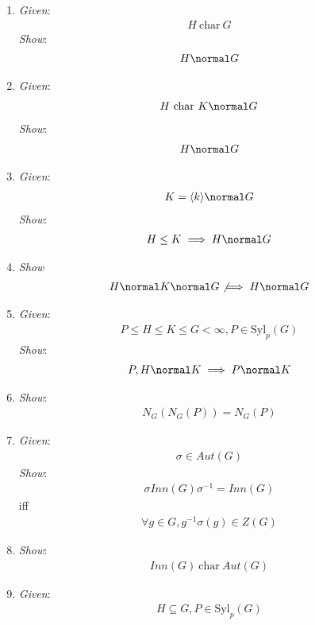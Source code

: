 \begin{enumerate}
\def\labelenumi{\arabic{enumi}.}
\item
  \emph{Given}: \begin{align*}
  H~\text{char}~G\end{align*}
   \emph{Show}: \begin{align*}
  H \normal G\end{align*}
\item
  \emph{Given}: \begin{align*}
  H ~\text{char}~ K \normal G\end{align*}
   \emph{Show}: \begin{align*}
  H \normal G\end{align*}
\item
  \emph{Given}: \begin{align*}
  K = \langle k \rangle \normal G\end{align*}
   \emph{Show}: \begin{align*}
  H \leq K \implies H \normal G\end{align*}
\item
  \emph{Show} \begin{align*}
  H \normal K \normal G \not\implies H \normal G\end{align*}
\item
  \emph{Given}: \begin{align*}
  P \leq H \leq K \leq G < \infty, P \in \text{Syl}_p(G)\end{align*}
   \emph{Show}: \begin{align*}
  P, H \normal K \implies P \normal K\end{align*}
\item
  \emph{Show}: \begin{align*}
  N_G(N_G(P)) = N_G(P)\end{align*}
\item
  \emph{Given}: \begin{align*}
  \sigma \in Aut(G)\end{align*}
   \emph{Show}: \begin{align*}
  \sigma Inn(G) \sigma^{-1} = Inn(G)\end{align*}
   iff \begin{align*}
  \forall g\in G, g^{-1}\sigma(g)\in Z(G)\end{align*}
\item
  \emph{Show}: \begin{align*}
  Inn(G) ~\text{char}~ Aut(G)\end{align*}
\item
  \emph{Given}: \begin{align*}
  H \subseteq G, P \in \text{Syl}_p(G)\end{align*}


\end{enumerate}
